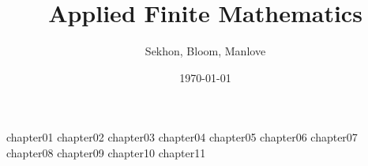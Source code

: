 \documentclass[12pt]{book}
\begin{document}

\frontmatter
\title{Applied Finite Mathematics}
\author{Sekhon, Bloom, Manlove}
\date{\today}
\maketitle
\tableofcontents

\mainmatter
{chapter01}
{chapter02}
{chapter03}
{chapter04}
{chapter05}
{chapter06}
{chapter07}
{chapter08}
{chapter09}
{chapter10}
{chapter11}


\backmatter
\end{document}
